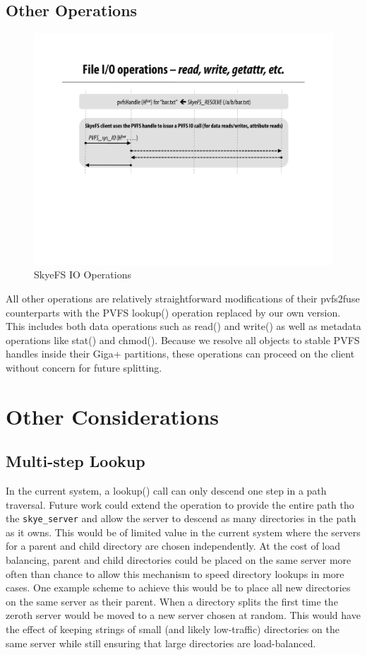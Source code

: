 \documentclass[letterpaper]{article}
\newcommand{\code}[1]{\texttt{#1}}
\begin{document}
\subsection{Other Operations}
\begin{figure}
\begin{center}
\includegraphics[scale=0.4]{figure-other}
\end{center}
\caption{SkyeFS IO Operations}
\end{figure}
All other operations are relatively straightforward modifications of their
pvfs2\-fuse counterparts with the PVFS lookup() operation replaced by our own
version.  This includes both data operations such as read() and write() as well
as metadata operations like stat() and chmod().  Because we resolve all objects
to stable PVFS handles inside their Giga+ partitions, these operations can
proceed on the client without concern for future splitting.

\section{Other Considerations}
\subsection{Multi-step Lookup}
In the current system, a lookup() call can only descend one step in a path
traversal.  Future work could extend the operation to provide the entire path
tho the \code{skye\_\-server} and allow the server to descend as many directories in the
path as it owns.  This would be of limited value in the current system where the
servers for a parent and child directory are chosen independently.  At the cost
of load balancing, parent and child directories could be placed on the same
server more often than chance to allow this mechanism to speed directory lookups
in more cases.  One example scheme to achieve this would be to place all new
directories on the same server as their parent.  When a directory splits the
first time the zeroth server would be moved to a new server chosen at random.
This would have the effect of keeping strings of small (and likely low-traffic)
directories on the same server while still ensuring that large directories are
load-balanced.
\end{document}
